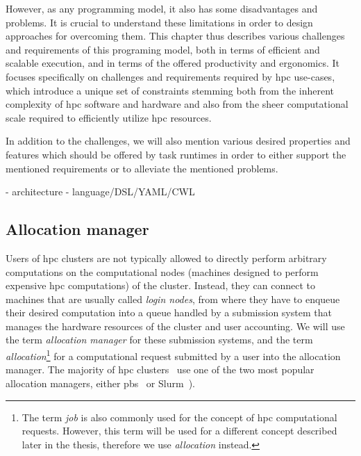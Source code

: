 However, as any programming model, it also has some disadvantages and problems. It is crucial to
understand these limitations in order to design approaches for overcoming them. This chapter thus
describes various challenges and requirements of this programing model, both in terms of efficient
and scalable execution, and in terms of the offered productivity and ergonomics. It focuses
specifically on challenges and requirements required by \gls{hpc} use-cases,
which introduce a unique set of constraints stemming both from the inherent complexity of
\gls{hpc} software and hardware and also from the sheer computational scale
required to efficiently utilize \gls{hpc} resources.

In addition to the challenges, we will also mention various desired properties and features which
should be offered by task runtimes in order to either support the mentioned requirements or to
alleviate the mentioned problems.

- architecture
- language/DSL/YAML/CWL



\cite{task_based_taxonomy}

\subsection{Allocation manager}
\label{sec:allocation-manager}
Users of \gls{hpc} clusters are not typically allowed to directly perform
arbitrary computations on the computational nodes (machines designed to perform expensive
\gls{hpc} computations) of the cluster. Instead, they can connect to machines
that are usually called \emph{login nodes}, from where they have to enqueue their desired
computation into a queue handled by a submission system that manages the hardware resources of the
cluster and user accounting. We will use the term \emph{allocation manager} for these submission
systems, and the term \emph{allocation}\footnote{The term \emph{job} is also commonly used for the concept of
\gls{hpc} computational requests. However, this term will be used for a different concept described later in the thesis, therefore we use \emph{allocation} instead.} for a computational
request submitted by a user into the allocation manager. The majority of
\gls{hpc} clusters~\cite{slurm-schedmd} use one of the two most popular
allocation managers, either \gls{pbs}~\cite{pbs} or
Slurm~\cite{slurm}).

